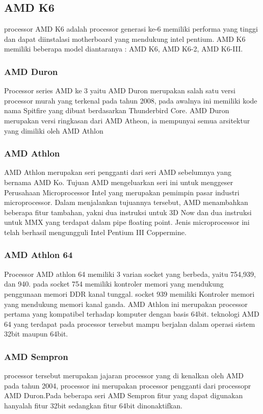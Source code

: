  			\subsection{ AMD K6 }
 	processor AMD K6 adalah processor generasi ke-6 memiliki performa yang tinggi dan dapat diinstalasi motherboard yang mendukung intel pentium. AMD K6 memiliki beberapa model diantaranya : AMD K6, AMD K6-2, AMD K6-III.


			\subsubsection{AMD Duron}
 	Processor series AMD ke 3 yaitu AMD Duron merupakan salah satu versi processor murah yang terkenal pada tahun 2008, pada awalnya ini memiliki kode nama Spitfire yang dibuat berdasarkan Thunderbird Core. AMD Duron merupakan versi ringkasan dari AMD Atheon, ia mempunyai semua arsitektur yang dimiliki oleh AMD  Athlon
 			\subsubsection{AMD Athlon}
 	AMD Athlon merupakan seri pengganti dari seri AMD sebelumnya yang bernama AMD Ko. Tujuan AMD mengeluarkan seri ini untuk menggeser Perusahaan Microprocessor Intel yang merupakan pemimpin pasar industri microprocessor. Dalam menjalankan tujuannya tersebut, AMD menambahkan beberapa fitur tambahan, yakni dua instruksi untuk 3D Now dan dua instruksi untuk MMX yang terdapat dalam pipe floating point. Jenis microprocessor ini telah berhasil mengungguli Intel Pentium III Coppermine.


 			\subsubsection{AMD Athlon 64}
 	Processor AMD athlon 64 memiliki 3 varian socket yang berbeda, yaitu 754,939, dan 940. pada socket 754 memiliki kontroler memori yang mendukung penggunaan memori DDR kanal tunggal. socket 939 memiliki Kontroler memori yang mendukung memori kanal ganda. AMD Athlon ini merupakan processor pertama yang kompatibel terhadap komputer dengan basis 64bit.  teknologi AMD 64 yang terdapat pada processor tersebut mampu berjalan dalam operasi sistem 32bit maupun 64bit.


 			\subsubsection {AMD Sempron}
 	processor tersebut merupakan jajaran processor yang di kenalkan oleh AMD pada tahun 2004, processor ini merupakan processor pengganti dari processopr AMD Duron.Pada beberapa seri AMD Sempron fitur yang dapat digunakan hanyalah fitur 32bit sedangkan fitur 64bit dinonaktifkan.

